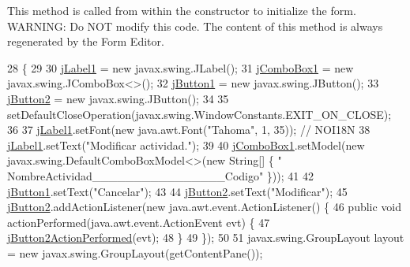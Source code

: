 This method is called from within the constructor to initialize the form. W\+A\+R\+N\+I\+NG\+: Do N\+OT modify this code. The content of this method is always regenerated by the Form Editor. 
\begin{DoxyCode}
28                                   \{
29 
30         \mbox{\hyperlink{classsoftware_1_1parasoftware4_a5298ea7ec05625113d0f4c0bfcd0c801}{jLabel1}} = \textcolor{keyword}{new} javax.swing.JLabel();
31         \mbox{\hyperlink{classsoftware_1_1parasoftware4_a0573e3c63f0f22f99ad45722e4575431}{jComboBox1}} = \textcolor{keyword}{new} javax.swing.JComboBox<>();
32         \mbox{\hyperlink{classsoftware_1_1parasoftware4_a0c714f857c09b57977dcab3d49056a17}{jButton1}} = \textcolor{keyword}{new} javax.swing.JButton();
33         \mbox{\hyperlink{classsoftware_1_1parasoftware4_aefe98fde668b50160e97144d76536de8}{jButton2}} = \textcolor{keyword}{new} javax.swing.JButton();
34 
35         setDefaultCloseOperation(javax.swing.WindowConstants.EXIT\_ON\_CLOSE);
36 
37         \mbox{\hyperlink{classsoftware_1_1parasoftware4_a5298ea7ec05625113d0f4c0bfcd0c801}{jLabel1}}.setFont(\textcolor{keyword}{new} java.awt.Font(\textcolor{stringliteral}{"Tahoma"}, 1, 35)); \textcolor{comment}{// NOI18N}
38         \mbox{\hyperlink{classsoftware_1_1parasoftware4_a5298ea7ec05625113d0f4c0bfcd0c801}{jLabel1}}.setText(\textcolor{stringliteral}{"Modificar actividad."});
39 
40         \mbox{\hyperlink{classsoftware_1_1parasoftware4_a0573e3c63f0f22f99ad45722e4575431}{jComboBox1}}.setModel(\textcolor{keyword}{new} javax.swing.DefaultComboBoxModel<>(\textcolor{keyword}{new} String[] \{ \textcolor{stringliteral}{"
      NombreActividad\_\_\_\_\_\_\_\_\_\_\_\_\_\_\_\_Codigo"} \}));
41 
42         \mbox{\hyperlink{classsoftware_1_1parasoftware4_a0c714f857c09b57977dcab3d49056a17}{jButton1}}.setText(\textcolor{stringliteral}{"Cancelar"});
43 
44         \mbox{\hyperlink{classsoftware_1_1parasoftware4_aefe98fde668b50160e97144d76536de8}{jButton2}}.setText(\textcolor{stringliteral}{"Modificar"});
45         \mbox{\hyperlink{classsoftware_1_1parasoftware4_aefe98fde668b50160e97144d76536de8}{jButton2}}.addActionListener(\textcolor{keyword}{new} java.awt.event.ActionListener() \{
46             \textcolor{keyword}{public} \textcolor{keywordtype}{void} actionPerformed(java.awt.event.ActionEvent evt) \{
47                 \mbox{\hyperlink{classsoftware_1_1parasoftware4_afcfd8a8b7284cb03ceb13bee312f4648}{jButton2ActionPerformed}}(evt);
48             \}
49         \});
50 
51         javax.swing.GroupLayout layout = \textcolor{keyword}{new} javax.swing.GroupLayout(getContentPane());

\end{DoxyCode}
